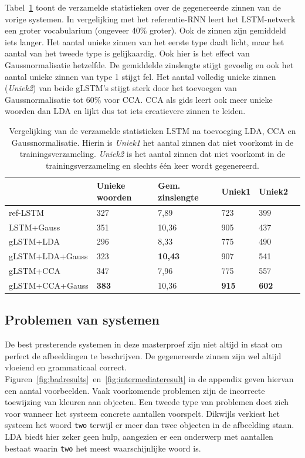 Tabel~\ref{table:lstm_stats} toont de verzamelde statistieken over de gegenereerde zinnen van de vorige systemen. In vergelijking met het referentie-RNN leert het LSTM-netwerk een groter vocabularium (ongeveer 40\% groter). Ook de zinnen zijn gemiddeld iets langer. Het aantal unieke zinnen van het eerste type daalt licht, maar het aantal van het tweede type is gelijkaardig.
Ook hier is het effect van Gaussnormalisatie hetzelfde. De gemiddelde zinslengte stijgt gevoelig en ook het aantal unieke zinnen van type 1 stijgt fel. Het aantal volledig unieke zinnen (\emph{Uniek2}) van beide gLSTM's stijgt sterk door het toevoegen van Gaussnormalisatie tot 60\% voor CCA. CCA als gids leert ook meer unieke woorden dan LDA en lijkt dus tot iets creatievere zinnen te leiden.
    \begin{table}
    	\centering
    	\begin{tabular}{llllll}
    		~                   & Unieke woorden & Gem. zinslengte & Uniek1 & Uniek2 \\ \hline
    		ref-LSTM         				  & 327   & 7,89   & 723   & 399  \\
    		LSTM+Gauss        				  & 351   & 10,36   & 905   & 437  \\
    		gLSTM+LDA         				  & 296   & 8,33   & 775   & 490     \\
    		gLSTM+LDA+Gauss 				  & 323   & \textbf{10,43}   & 907   & 541     \\
    		gLSTM+CCA         				  & 347   & 7,96   & 775   &557   \\
    		gLSTM+CCA+Gauss 				  & \textbf{383}   & 10,36   & \textbf{915}   & \textbf{602}    \\\hline
    	\end{tabular}
	\caption[Vergelijking van de verzamelde statistieken LSTM na toevoeging LDA, CCA en Gaussnormalisatie]{Vergelijking van de verzamelde statistieken LSTM na toevoeging LDA, CCA en Gaussnormalisatie. Hierin is \emph{Uniek1} het aantal zinnen dat niet voorkomt in de trainingsverzameling. \emph{Uniek2} is het aantal zinnen dat niet voorkomt in de trainingsverzameling en slechts \'e\'en keer wordt gegenereerd.}
    	\label{table:lstm_stats}
    \end{table}
    
\subsection{Problemen van systemen}
De best presterende systemen in deze masterproef zijn niet altijd in staat om perfect de afbeeldingen te beschrijven.
 De gegenereerde zinnen zijn wel altijd vloeiend en grammaticaal correct.
  Figuren~\ref{fig:badresults}~en~\ref{fig:intermediateresult} in de appendix geven hiervan een aantal voorbeelden.
Vaak voorkomende problemen zijn de incorrecte toewijzing van kleuren aan objecten.
Een tweede type van problemen doet zich voor wanneer het systeem concrete aantallen voorspelt.
Dikwijls verkiest het systeem het woord \texttt{two} terwijl er meer dan twee objecten in de afbeelding staan.
LDA biedt hier zeker geen hulp, aangezien er een onderwerp met aantallen bestaat waarin \texttt{two} het meest waarschijnlijke woord is.


